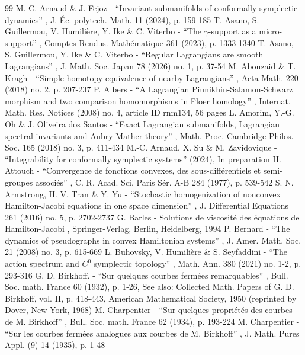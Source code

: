\begin{thebibliography}{99}
 M.-C. Arnaud \& J. Fejoz - “Invariant submanifolds of conformally symplectic dynamics” , J. Éc. polytech. Math. 11 (2024), p. 159-185
 T. Asano, S. Guillermou, V. Humilière, Y. Ike \& C. Viterbo - “The $\gamma $-support as a micro-support” , Comptes Rendus. Mathématique 361 (2023), p. 1333-1340
 T. Asano, S. Guillermou, Y. Ike \& C. Viterbo - “Regular Lagrangians are smooth Lagrangians” , J. Math. Soc. Japan 78 (2026) no. 1, p. 37-54
 M. Abouzaid \& T. Kragh - “Simple homotopy equivalence of nearby Lagrangians” , Acta Math. 220 (2018) no. 2, p. 207-237
 P. Albers - “A Lagrangian Piunikhin-Salamon-Schwarz morphism and two comparison homomorphisms in Floer homology” , Internat. Math. Res. Notices (2008) no. 4, article ID rnm134, 56 pages
 L. Amorim, Y.-G. Oh \& J. Oliveira dos Santos - “Exact Lagrangian submanifolds, Lagrangian spectral invariants and Aubry-Mather theory” , Math. Proc. Cambridge Philos. Soc. 165 (2018) no. 3, p. 411-434
 M.-C. Arnaud, X. Su \& M. Zavidovique - “Integrability for conformally symplectic systems” (2024), In preparation
 H. Attouch - “Convergence de fonctions convexes, des sous-différentiels et semi-groupes associés” , C. R. Acad. Sci. Paris Sér. A-B 284 (1977), p. 539-542
 S. N. Armstrong, H. V. Tran \& Y. Yu - “Stochastic homogenization of nonconvex Hamilton-Jacobi equations in one space dimension” , J. Differential Equations 261 (2016) no. 5, p. 2702-2737
 G. Barles - Solutions de viscosité des équations de Hamilton-Jacobi , Springer-Verlag, Berlin, Heidelberg, 1994
 P. Bernard - “The dynamics of pseudographs in convex Hamiltonian systems” , J. Amer. Math. Soc. 21 (2008) no. 3, p. 615-669
 L. Buhovsky, V. Humilière \& S. Seyfaddini - “The action spectrum and $C^0$ symplectic topology” , Math. Ann. 380 (2021) no. 1-2, p. 293-316
 G. D. Birkhoff. - “Sur quelques courbes fermées remarquables” , Bull. Soc. math. France 60 (1932), p. 1-26, See also: Collected Math. Papers of G. D. Birkhoff, vol. II, p. 418-443, American Mathematical Society, 1950 (reprinted by Dover, New York, 1968)
 M. Charpentier - “Sur quelques propriétés des courbes de M. Birkhoff” , Bull. Soc. math. France 62 (1934), p. 193-224
 M. Charpentier - “Sur les courbes fermées analogues aux courbes de M. Birkhoff” , J. Math. Pures Appl. (9) 14 (1935), p. 1-48

\end{thebibliography}
